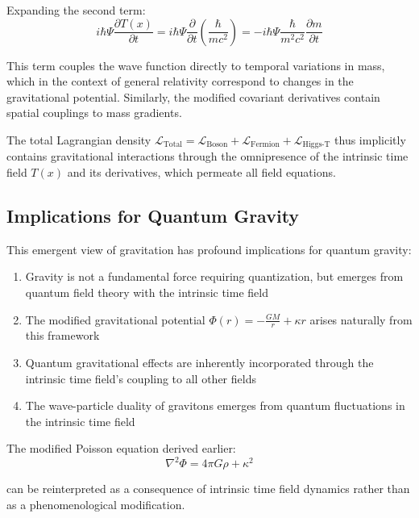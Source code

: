 \documentclass{article}
\theoremstyle{definition}
\theoremstyle{remark}
\newcommand{\Tfield}{T(x)} %
\begin{document}
Expanding the second term:
\begin{equation}
	i\hbar\Psi\frac{\partial \Tfield}{\partial t} = i\hbar\Psi\frac{\partial}{\partial t}\left(\frac{\hbar}{mc^2}\right) = -i\hbar\Psi\frac{\hbar}{m^2c^2}\frac{\partial m}{\partial t}
\end{equation}

This term couples the wave function directly to temporal variations in mass, which in the context of general relativity correspond to changes in the gravitational potential. Similarly, the modified covariant derivatives contain spatial couplings to mass gradients.

The total Lagrangian density $\mathcal{L}_{\text{Total}} = \mathcal{L}_{\text{Boson}} + \mathcal{L}_{\text{Fermion}} + \mathcal{L}_{\text{Higgs-T}}$ thus implicitly contains gravitational interactions through the omnipresence of the intrinsic time field $\Tfield$ and its derivatives, which permeate all field equations.

\subsection{Implications for Quantum Gravity}

This emergent view of gravitation has profound implications for quantum gravity:

\begin{enumerate}
	\item Gravity is not a fundamental force requiring quantization, but emerges from quantum field theory with the intrinsic time field
	\item The modified gravitational potential $\Phi(r) = -\frac{GM}{r} + \kappa r$ arises naturally from this framework
	\item Quantum gravitational effects are inherently incorporated through the intrinsic time field's coupling to all other fields
	\item The wave-particle duality of gravitons emerges from quantum fluctuations in the intrinsic time field
\end{enumerate}

The modified Poisson equation derived earlier:
\begin{equation}
	\nabla^2 \Phi = 4\pi G \rho + \kappa^2
\end{equation}

can be reinterpreted as a consequence of intrinsic time field dynamics rather than as a phenomenological modification.
\end{document}
